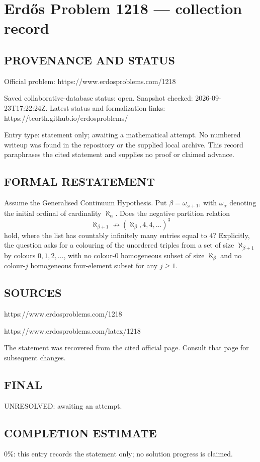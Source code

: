 \section*{Erd\H{o}s Problem 1218 --- collection record}

\subsection*{PROVENANCE AND STATUS}
Official problem: https://www.erdosproblems.com/1218

Saved collaborative-database status: open.
Snapshot checked: 2026-09-23T17:22:24Z.
Latest status and formalization links: https://teorth.github.io/erdosproblems/

Entry type: statement only; awaiting a mathematical attempt. No numbered writeup was found in the repository or the supplied local archive. This record paraphrases the cited statement and supplies no proof or claimed advance.

\subsection*{FORMAL RESTATEMENT}
Assume the Generalised Continuum Hypothesis. Put $\beta=\omega_{\omega+1}$, with $\omega_\alpha$ denoting the initial ordinal of cardinality $\aleph_\alpha$. Does the negative partition relation
\[\aleph_{\beta+1}\not\longrightarrow(\aleph_\beta,4,4,\ldots)^3\]
hold, where the list has countably infinitely many entries equal to $4$? Explicitly, the question asks for a colouring of the unordered triples from a set of size $\aleph_{\beta+1}$ by colours $0,1,2,\ldots$, with no colour-$0$ homogeneous subset of size $\aleph_\beta$ and no colour-$j$ homogeneous four-element subset for any $j\geq1$.

\subsection*{SOURCES}
https://www.erdosproblems.com/1218

https://www.erdosproblems.com/latex/1218

The statement was recovered from the cited official page. Consult that page for subsequent changes.

\subsection*{FINAL}
UNRESOLVED: awaiting an attempt.

\subsection*{COMPLETION ESTIMATE}
$0\%$: this entry records the statement only; no solution progress is claimed.
